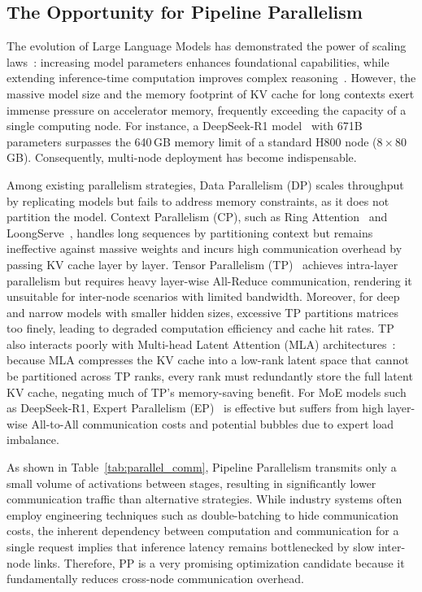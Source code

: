\documentclass[12pt,a4paper]{article}
\newcommand{\kvcache}{KV cache\xspace}
\newcommand{\mla}{Multi-head Latent Attention (MLA)\xspace}
\begin{document}
\subsection{The Opportunity for Pipeline Parallelism}

The evolution of Large Language Models has demonstrated the power of scaling laws~\cite{scaling-laws}: increasing model parameters enhances foundational capabilities, while extending inference-time computation improves complex reasoning~\cite{test-time-compute}.
However, the massive model size and the memory footprint of \kvcache for long contexts exert immense pressure on accelerator memory, frequently exceeding the capacity of a single computing node.
For instance, a DeepSeek-R1 model~\cite{deepseek-r1} with 671B parameters surpasses the 640\,GB memory limit of a standard H800 node ($8 \times 80$\,GB).
Consequently, multi-node deployment has become indispensable.

Among existing parallelism strategies, Data Parallelism (DP) scales throughput by replicating models but fails to address memory constraints, as it does not partition the model.
Context Parallelism (CP), such as Ring Attention~\cite{ringattention} and LoongServe~\cite{loongserve}, handles long sequences by partitioning context but remains ineffective against massive weights and incurs high communication overhead by passing \kvcache layer by layer.
Tensor Parallelism (TP)~\cite{megatron} achieves intra-layer parallelism but requires heavy layer-wise All-Reduce communication, rendering it unsuitable for inter-node scenarios with limited bandwidth.
Moreover, for deep and narrow models with smaller hidden sizes, excessive TP partitions matrices too finely, leading to degraded computation efficiency and cache hit rates.
TP also interacts poorly with \mla architectures~\cite{deepseekv2}: because MLA compresses the \kvcache into a low-rank latent space that cannot be partitioned across TP ranks, every rank must redundantly store the full latent \kvcache, negating much of TP's memory-saving benefit.
For MoE models such as DeepSeek-R1, Expert Parallelism (EP)~\cite{deepseekv3,cloudmatrix384} is effective but suffers from high layer-wise All-to-All communication costs and potential bubbles due to expert load imbalance.

As shown in Table~\ref{tab:parallel_comm}, Pipeline Parallelism transmits only a small volume of activations between stages, resulting in significantly lower communication traffic than alternative strategies.
While industry systems often employ engineering techniques such as double-batching to hide communication costs, the inherent dependency between computation and communication for a single request implies that inference latency remains bottlenecked by slow inter-node links.
Therefore, PP is a very promising optimization candidate because it fundamentally reduces cross-node communication overhead.
\end{document}
